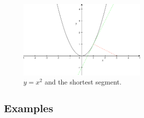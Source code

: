 \documentclass[12pt,addpoints, answers, fleqn]{exam}
\begin{document}
\begin{figure}[htbp] %
   \centering
   \includegraphics[width=2.5in]{./graphics/graph2402.pdf} 
   \caption{$y=x^2$ and the shortest segment.}
   \label{fig:2402}
\end{figure}


\subsection{Examples}
\end{document}
